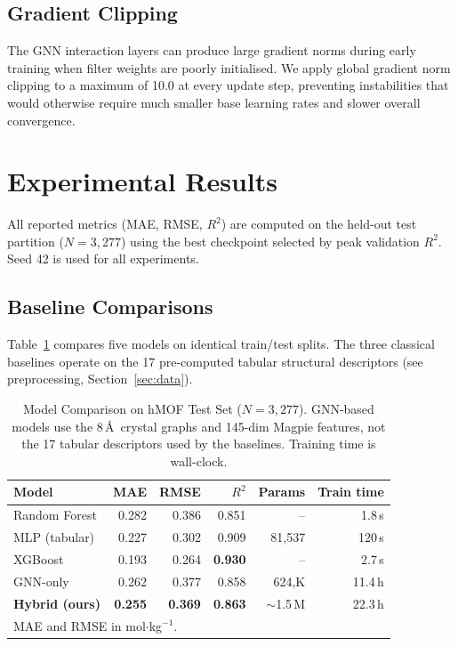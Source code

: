 \documentclass[conference]{IEEEtran}
\begin{document}
\subsection{Gradient Clipping}

The GNN interaction layers can produce large gradient norms during early
training when filter weights are poorly initialised.  We apply global
gradient norm clipping to a maximum of 10.0 at every update step,
preventing instabilities that would otherwise require much smaller base
learning rates and slower overall convergence.

\section{Experimental Results}
\label{sec:results}

All reported metrics (MAE, RMSE, $R^2$) are computed on the held-out test
partition ($N=3{,}277$) using the best checkpoint selected by peak
validation $R^2$.  Seed 42 is used for all experiments.

\subsection{Baseline Comparisons}
\label{sec:baselines}

Table~\ref{tab:baselines} compares five models on identical train/test splits.
The three classical baselines operate on the 17 pre-computed tabular
structural descriptors (see preprocessing, Section~\ref{sec:data}).

\begin{table}[!t]
\renewcommand{\arraystretch}{1.25}
\centering
\caption{Model Comparison on hMOF Test Set ($N=3{,}277$).
         GNN-based models use the 8\,\AA\ crystal graphs and 145-dim Magpie
         features, not the 17 tabular descriptors used by the baselines.
         Training time is wall-clock.}
\label{tab:baselines}
\begin{tabular}{@{}lrrrrr@{}}
\toprule
\textbf{Model} & \textbf{MAE} & \textbf{RMSE} & \textbf{$R^2$}
               & \textbf{Params} & \textbf{Train time}\\
\midrule
Random Forest  & 0.282 & 0.386 & 0.851 & --     & 1.8\,s   \\
MLP (tabular)  & 0.227 & 0.302 & 0.909 & 81{,}537& 120\,s  \\
XGBoost        & 0.193 & 0.264 & \textbf{0.930} & -- & 2.7\,s\\
\midrule
GNN-only       & 0.262 & 0.377 & 0.858 & 624{,}K& 11.4\,h \\
\textbf{Hybrid (ours)} & \textbf{0.255} & \textbf{0.369} & \textbf{0.863}
               & $\sim$1.5\,M & 22.3\,h\\
\bottomrule
\multicolumn{6}{l}{\scriptsize MAE and RMSE in mol$\cdot$kg$^{-1}$.}\\
\end{tabular}
\end{table}
\end{document}
